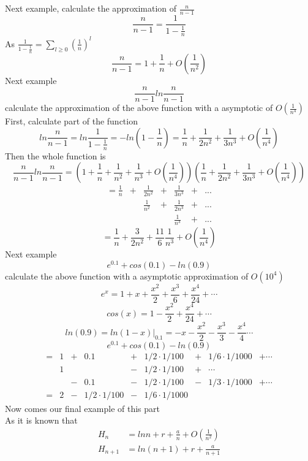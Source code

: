 \documentclass[11pt]{article}
\begin{document}
\subsection{}
Next example, calculate the approximation of \(\frac{n}{n-1}\)
\[
\frac{n}{n-1}=\frac{1}{1-\frac{1}{n}}
\]
As \(\frac{1}{1-\frac{1}{n}}=\sum_{l\geq 0}(\frac{1}{n})^l\)
\[
\frac{n}{n-1}=1+\frac{1}{n}+O(\frac{1}{n^2})
\]
Next example \\
\[
\frac{n}{n-1}ln\frac{n}{n-1}
\]
calculate the approximation of the above function with a asymptotic of
\(O(\frac{1}{n^4})\) \\
First, calculate part of the function \\
\[
ln\frac{n}{n-1}=ln\frac{1}{1-\frac{1}{n}}=-ln(1-\frac{1}{n})=\frac{1}{n}+\frac{1}{2n^2}+\frac{1}{3n^3}+O(\frac{1}{n^4})
\]
Then the whole function is \\
\[
\frac{n}{n-1}ln\frac{n}{n-1}=\left(1+\frac{1}{n}+\frac{1}{n^2}+\frac{1}{n^3}+O\left(\frac{1}{n^4}\right)\right)\left(\frac{1}{n}+\frac{1}{2n^2}+\frac{1}{3n^3}+O\left(\frac{1}{n^4}\right)\right)
\]
\[
\begin{matrix}
=\frac{1}{n} & + &\frac{1}{2n^2} & + & \frac{1}{3n^3} & + & ... \\
         ~       & ~ &\frac{1}{n^2}  & + & \frac{1}{2n^3} & + & ... \\
         ~       & ~ &       ~           & ~ &\frac{1}{n^3} & + & ...
\end{matrix}
\]
\[
=\frac{1}{n}+\frac{3}{2n^2}+\frac{11}{6}\frac{1}{n^3}+O\left(\frac{1}{n^4}\right)
\]
Next example \\
\[
e^{0.1}+cos(0.1)-ln(0.9)
\]
calculate the above function with a asymptotic approximation of \(O(10^4)\) \\
\[
e^x=1+x+\frac{x^2}{2}+\frac{x^3}{6}+\frac{x^4}{24}+\cdots
\]
\[
cos(x)=1-\frac{x^2}{2}+\frac{x^4}{24}+\cdots
\]
\[
ln(0.9)=ln(1-x)|_{0.1}=-x-\frac{x^2}{2}-\frac{x^3}{3}-\frac{x^4}{4}\cdots
\]
\[
e^{0.1}+cos(0.1)-ln(0.9)
\]
\[
\begin{matrix}
= & 1 & + & 0.1 & + & 1/2\cdot 1/100 & + & 1/6\cdot 1/1000 & +\cdots \\
~ & 1 & ~ &  ~  & - & 1/2\cdot 1/100 & + & \cdots & ~ \\
~ & ~ & - & 0.1 & - & 1/2\cdot 1/100 & - & 1/3\cdot 1/1000 & +\cdots \\
= & 2 & - & 1/2\cdot 1/100 &-& 1/6\cdot 1/1000
\end{matrix}
\]
Now comes our final example of this part\\
As it is known that\\
\begin{align*}
H_n&=lnn+r+\frac{a}{n}+O(\frac{1}{n^2}) \\
H_{n+1}&=ln(n+1)+r+\frac{a}{n+1}
\end{align*}
\end{document}
